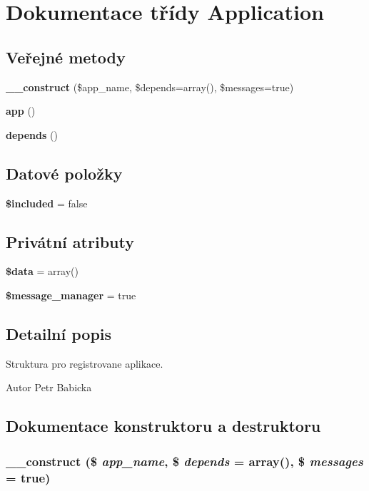 \section{Dokumentace třídy Application}
\label{de/d6b/class_application}
\subsection*{Veřejné metody}
\begin{DoxyCompactItemize}
\item 
{\bf \_\-\_\-construct} (\$app\_\-name, \$depends=array(), \$messages=true)
\item 
{\bf app} ()
\item 
{\bf depends} ()
\end{DoxyCompactItemize}
\subsection*{Datové položky}
\begin{DoxyCompactItemize}
\item 
{\bf \$included} = false
\end{DoxyCompactItemize}
\subsection*{Privátní atributy}
\begin{DoxyCompactItemize}
\item 
{\bf \$data} = array()
\item 
{\bf \$message\_\-manager} = true
\end{DoxyCompactItemize}


\subsection{Detailní popis}
Struktura pro registrovane aplikace. \begin{DoxyAuthor}{Autor}
Petr Babicka 
\end{DoxyAuthor}


\subsection{Dokumentace konstruktoru a destruktoru}
\subsubsection[{\_\-\_\-construct}]{\setlength{\rightskip}{0pt plus 5cm}\_\-\_\-construct (\$ {\em app\_\-name}, \/  \$ {\em depends} = {\ttfamily array()}, \/  \$ {\em messages} = {\ttfamily true})}\label{de/d6b/class_application_a32a195a9fb26ab28caea62fa894d7c51}

